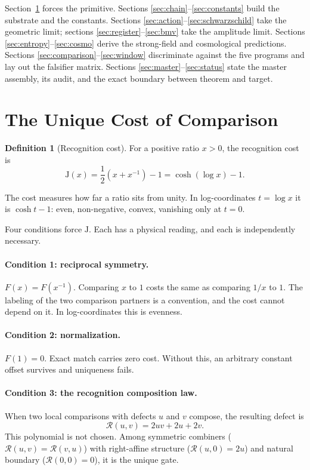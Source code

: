 \documentclass[11pt,letterpaper]{article}
\theoremstyle{definition}
\newtheorem{definition}[theorem]{Definition}
\newcommand{\J}{\mathrm{J}}
\begin{document}
Section~\ref{sec:cost} forces the primitive.  Sections
\ref{sec:chain}--\ref{sec:constants} build the substrate and the
constants.  Sections \ref{sec:action}--\ref{sec:schwarzschild} take the
geometric limit; sections \ref{sec:register}--\ref{sec:bmv} take the
amplitude limit.  Sections \ref{sec:entropy}--\ref{sec:cosmo} derive
the strong-field and cosmological predictions.  Sections
\ref{sec:comparison}--\ref{sec:window} discriminate against the five
programs and lay out the falsifier matrix.  Sections
\ref{sec:master}--\ref{sec:status} state the master assembly, its
audit, and the exact boundary between theorem and target.

\section{The Unique Cost of Comparison}
\label{sec:cost}

\begin{definition}[Recognition cost]
For a positive ratio $x>0$, the recognition cost is
\begin{equation}\label{eq:J}
\J(x)=\frac{1}{2}\left(x+x^{-1}\right)-1=\cosh(\log x)-1 .
\end{equation}
\end{definition}

The cost measures how far a ratio sits from unity.  In log-coordinates
$t=\log x$ it is $\cosh t-1$: even, non-negative, convex, vanishing
only at $t=0$.

Four conditions force $\J$.  Each has a physical reading, and each is
independently necessary.

\paragraph{Condition 1: reciprocal symmetry.}
$F(x)=F(x^{-1})$.  Comparing $x$ to $1$ costs the same as comparing
$1/x$ to $1$.  The labeling of the two comparison partners is a
convention, and the cost cannot depend on it.  In log-coordinates this
is evenness.

\paragraph{Condition 2: normalization.}
$F(1)=0$.  Exact match carries zero cost.  Without this, an arbitrary
constant offset survives and uniqueness fails.

\paragraph{Condition 3: the recognition composition law.}
When two local comparisons with defects $u$ and $v$ compose, the
resulting defect is
\begin{equation}\label{eq:rcl}
\mathcal{R}(u,v)=2uv+2u+2v .
\end{equation}
This polynomial is not chosen.  Among symmetric combiners
($\mathcal{R}(u,v)=\mathcal{R}(v,u)$) with right-affine structure
($\mathcal{R}(u,0)=2u$) and natural boundary ($\mathcal{R}(0,0)=0$),
it is the unique gate.
\end{document}
